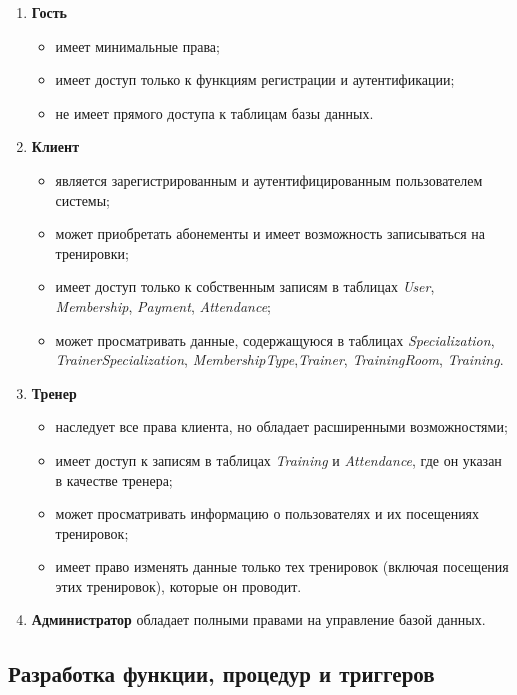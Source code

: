 \begin{enumerate}[label=\arabic*.]
	\item \textbf{Гость}
	\begin{itemize}
		\item имеет минимальные права;
		\item имеет доступ только к функциям регистрации и аутентификации;
		\item не имеет прямого доступа к таблицам базы данных.
	\end{itemize}
	
	\item \textbf{Клиент}
	\begin{itemize}
		\item является зарегистрированным и аутентифицированным пользователем системы;
		\item может приобретать абонементы и имеет возможность записываться на тренировки;
		\item имеет доступ только к собственным записям в таблицах \textit{User}, \textit{Membership}, \textit{Payment}, \textit{Attendance};
		\item может просматривать данные, содержащуюся в таблицах \textit{Specialization}, \textit{TrainerSpecialization}, \textit{MembershipType},\textit{Trainer}, \textit{TrainingRoom}, \textit{Training}.
	\end{itemize}
	
	\item \textbf{Тренер}
	\begin{itemize}
		\item наследует все права клиента, но обладает расширенными возможностями;
		\item имеет доступ к записям в таблицах \textit{Training} и \textit{Attendance}, где он указан в качестве тренера;
		\item может просматривать информацию о пользователях и их посещениях тренировок;
		\item имеет право изменять данные только тех тренировок (включая посещения этих тренировок), которые он проводит.
	\end{itemize}
	
	\item \textbf{Администратор} обладает полными правами на управление базой данных.
\end{enumerate}

\subsection{Разработка функции, процедур и триггеров}

